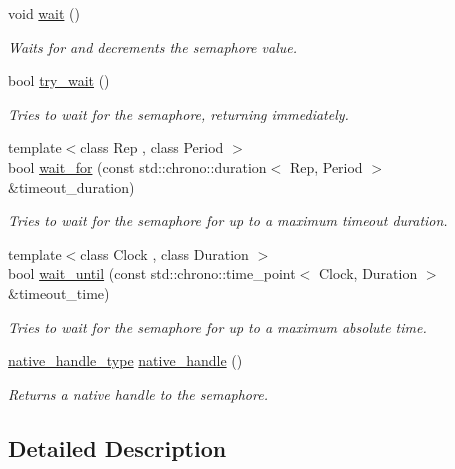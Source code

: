 \begin{DoxyCompactItemize}
void \hyperlink{classcpen333_1_1thread_1_1basic__semaphore_ac5cacef970643d393429ff87c0c6d6bf}{wait} ()
\begin{DoxyCompactList}\small\item\em Waits for and decrements the semaphore value. \end{DoxyCompactList}\item 
bool \hyperlink{classcpen333_1_1thread_1_1basic__semaphore_a72eb19243d4c55013f7fca9e5aa059f5}{try\+\_\+wait} ()
\begin{DoxyCompactList}\small\item\em Tries to wait for the semaphore, returning immediately. \end{DoxyCompactList}\item 
{\footnotesize template$<$class Rep , class Period $>$ }\\bool \hyperlink{classcpen333_1_1thread_1_1basic__semaphore_a500ae89545ae6b639ad347d50a53e2a8}{wait\+\_\+for} (const std\+::chrono\+::duration$<$ Rep, Period $>$ \&timeout\+\_\+duration)
\begin{DoxyCompactList}\small\item\em Tries to wait for the semaphore for up to a maximum timeout duration. \end{DoxyCompactList}\item 
{\footnotesize template$<$class Clock , class Duration $>$ }\\bool \hyperlink{classcpen333_1_1thread_1_1basic__semaphore_a19d3b188f86c565acbf83ec4872d9773}{wait\+\_\+until} (const std\+::chrono\+::time\+\_\+point$<$ Clock, Duration $>$ \&timeout\+\_\+time)
\begin{DoxyCompactList}\small\item\em Tries to wait for the semaphore for up to a maximum absolute time. \end{DoxyCompactList}\item 
\hyperlink{classcpen333_1_1thread_1_1basic__semaphore_a22e2293b6882f2bf4312aeb167a0b409}{native\+\_\+handle\+\_\+type} \hyperlink{classcpen333_1_1thread_1_1basic__semaphore_a3c3cd804e1aaa10f414820867f2e3798}{native\+\_\+handle} ()
\begin{DoxyCompactList}\small\item\em Returns a native handle to the semaphore. \end{DoxyCompactList}\end{DoxyCompactItemize}


\subsection{Detailed Description}
